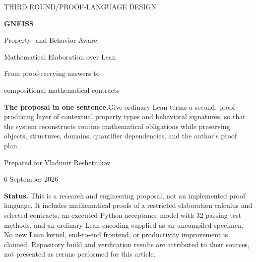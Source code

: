 \documentclass[11pt,letterpaper]{article}
\theoremstyle{definition}
\theoremstyle{remark}
\begin{document}
\begin{titlepage}
\vspace*{.6in}
{\color{ink}\Large THIRD ROUND\quad /\quad PROOF-LANGUAGE DESIGN\par}
\vspace{.45in}
{\color{ink}\fontsize{38}{43}\selectfont\bfseries GNEISS\par}
\vspace{.18in}
{\fontsize{23}{29}\selectfont Property- and Behavior-Aware\par Mathematical Elaboration over Lean\par}
\vspace{.35in}
{\large From proof-carrying answers to\par compositional mathematical contracts\par}
\vspace{.5in}
\begin{designbox}
\textbf{The proposal in one sentence.}\quad Give ordinary Lean terms a second,
proof-producing layer of contextual property types and behavioral signatures,
so that the system reconstructs routine mathematical obligations while preserving
objects, structures, domains, quantifier dependencies, and the author's proof plan.
\end{designbox}
\vspace{.3in}
{\large Prepared for Vladimir Reshetnikov\par}
{\large 6 September 2026\par}
\vfill
\textbf{Status.} This is a research and engineering proposal, not an implemented
proof language. It includes mathematical proofs of a restricted elaboration
calculus and selected contracts, an executed Python acceptance model with 32
passing test methods, and an ordinary-Lean encoding supplied as an uncompiled
specimen. No new Lean kernel, end-to-end frontend, or productivity improvement
is claimed. Repository build and verification results are attributed to their
sources, not presented as reruns performed for this article.
\end{titlepage}
\end{document}

